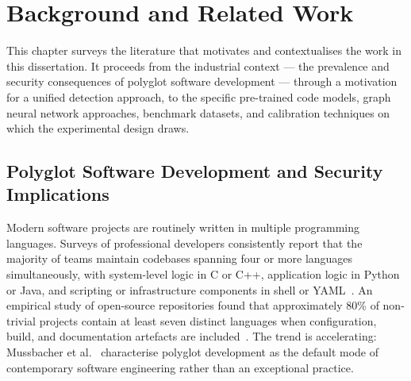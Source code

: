 \chapter{Background and Related Work}
\label{ch:background}

This chapter surveys the literature that motivates and contextualises the work in this
dissertation.
It proceeds from the industrial context --- the prevalence and security consequences of
polyglot software development --- through a motivation for a unified detection approach,
to the specific pre-trained code models, graph neural network approaches, benchmark
datasets, and calibration techniques on which the experimental design draws.

\section{Polyglot Software Development and Security Implications}

Modern software projects are routinely written in multiple programming languages.
Surveys of professional developers consistently report that the majority of teams maintain
codebases spanning four or more languages simultaneously, with system-level logic in C or
C++, application logic in Python or Java, and scripting or infrastructure components in
shell or YAML~\cite{mayer2017multilanguage}.
An empirical study of open-source repositories found that approximately 80\% of
non-trivial projects contain at least seven distinct languages when configuration, build,
and documentation artefacts are included~\cite{yang2023demystifying}.
The trend is accelerating: Mussbacher et al.~\cite{mussbacher2024polyglot} characterise polyglot
development as the default mode of contemporary software engineering rather than an
exceptional practice.

